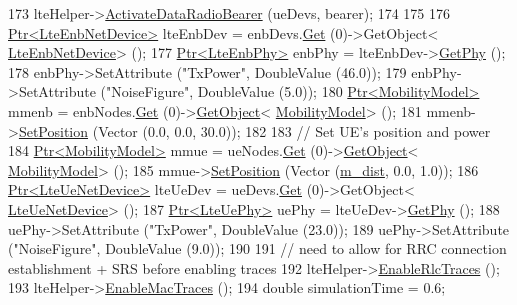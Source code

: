 \begin{DoxyCode}
173   lteHelper->\hyperlink{classns3_1_1LteHelper_ac896e16cf162e4beeaa292d39ab1b700}{ActivateDataRadioBearer} (ueDevs, bearer);
174   
175 
176   \hyperlink{classns3_1_1Ptr}{Ptr<LteEnbNetDevice>} lteEnbDev = enbDevs.\hyperlink{classns3_1_1NetDeviceContainer_a677d62594b5c9d2dea155cc5045f4d0b}{Get} (0)->GetObject<
      \hyperlink{classns3_1_1LteEnbNetDevice}{LteEnbNetDevice}> ();
177   \hyperlink{classns3_1_1Ptr}{Ptr<LteEnbPhy>} enbPhy = lteEnbDev->\hyperlink{classns3_1_1LteEnbNetDevice_a58db72130e0740f16a5e03b22e4a10a4}{GetPhy} ();
178   enbPhy->SetAttribute (\textcolor{stringliteral}{"TxPower"}, DoubleValue (46.0));
179   enbPhy->SetAttribute (\textcolor{stringliteral}{"NoiseFigure"}, DoubleValue (5.0));
180   \hyperlink{classns3_1_1Ptr}{Ptr<MobilityModel>} mmenb = enbNodes.\hyperlink{classns3_1_1NodeContainer_a9ed96e2ecc22e0f5a3d4842eb9bf90bf}{Get} (0)->\hyperlink{classns3_1_1Object_a13e18c00017096c8381eb651d5bd0783}{GetObject}<
      \hyperlink{classns3_1_1MobilityModel}{MobilityModel}> ();
181   mmenb->\hyperlink{classns3_1_1MobilityModel_ac584b3d5a309709d2f13ed6ada1e7640}{SetPosition} (Vector (0.0, 0.0, 30.0));
182 
183   \textcolor{comment}{// Set UE's position and power}
184   \hyperlink{classns3_1_1Ptr}{Ptr<MobilityModel>} mmue = ueNodes.\hyperlink{classns3_1_1NodeContainer_a9ed96e2ecc22e0f5a3d4842eb9bf90bf}{Get} (0)->\hyperlink{classns3_1_1Object_a13e18c00017096c8381eb651d5bd0783}{GetObject}<
      \hyperlink{classns3_1_1MobilityModel}{MobilityModel}> ();
185   mmue->\hyperlink{classns3_1_1MobilityModel_ac584b3d5a309709d2f13ed6ada1e7640}{SetPosition} (Vector (\hyperlink{classLenaMimoTestCase_ae63d46254a08c9e2b064d6c4855d5a77}{m\_dist}, 0.0, 1.0));
186   \hyperlink{classns3_1_1Ptr}{Ptr<LteUeNetDevice>} lteUeDev = ueDevs.\hyperlink{classns3_1_1NetDeviceContainer_a677d62594b5c9d2dea155cc5045f4d0b}{Get} (0)->GetObject<
      \hyperlink{classns3_1_1LteUeNetDevice}{LteUeNetDevice}> ();
187   \hyperlink{classns3_1_1Ptr}{Ptr<LteUePhy>} uePhy = lteUeDev->\hyperlink{classns3_1_1LteUeNetDevice_a2a9940a1e457a8bf3dae87fed4199c7a}{GetPhy} ();
188   uePhy->SetAttribute (\textcolor{stringliteral}{"TxPower"}, DoubleValue (23.0));
189   uePhy->SetAttribute (\textcolor{stringliteral}{"NoiseFigure"}, DoubleValue (9.0));
190   
191   \textcolor{comment}{// need to allow for RRC connection establishment + SRS before enabling traces}
192   lteHelper->\hyperlink{classns3_1_1LteHelper_abadfdd04d30b261e9b6f0846b4784928}{EnableRlcTraces} ();
193   lteHelper->\hyperlink{classns3_1_1LteHelper_affa3a12841520407d3662417fe41863d}{EnableMacTraces} ();
194   \textcolor{keywordtype}{double} simulationTime = 0.6; 

\end{DoxyCode}
